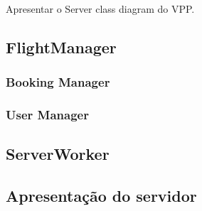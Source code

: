 \documentclass[relatorio]{subfiles}
\begin{document}
    
Apresentar o Server class diagram do VPP.

\subsection{FlightManager}

\subsubsection{Booking Manager}

\subsubsection{User Manager}

\subsection{ServerWorker}

\subsection{Apresentação do servidor}
\end{document}

